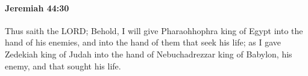 
		\paragraph{Jeremiah 44:30} %
			\label{JEREMIAH-44-30}

			Thus saith the LORD; Behold, I will give Pharaohhophra king of Egypt into the hand of his enemies, and into the hand of them that seek his life; as I gave Zedekiah king of Judah into the hand of Nebuchadrezzar king of Babylon, his enemy, and that sought his life.

